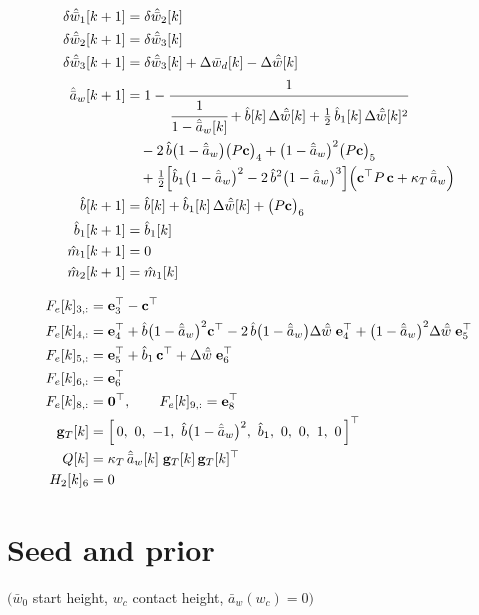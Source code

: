 \documentclass[11pt,a4paper,fontset=none]{ctexart}
\newcommand{\ba}{\bar{a}}
\newcommand{\bw}{\bar{w}}
\newcommand{\dWh}{\Delta\hat{\bw}}
\newcommand{\ah}{\hat{\ba}_w}
\newcommand{\bh}{\hat{b}}
\newcommand{\bhh}{\hat{b}_1}
\begin{document}
\begin{align*}
\delta\hat{\bw}_1[k+1] &= \delta\hat{\bw}_2[k] \\
\delta\hat{\bw}_2[k+1] &= \delta\hat{\bw}_3[k] \\
\delta\hat{\bw}_3[k+1] &= \delta\hat{\bw}_3[k] + \Delta\bw_d[k] - \dWh[k] \\
\ah[k+1] &= 1 - \cfrac{1}{\cfrac{1}{1-\ah[k]} + \bh[k]\,\dWh[k] + \tfrac{1}{2}\,\bhh[k]\,\dWh[k]^{2}} \\
         &\quad - 2\,\bh\bigl(1-\ah\bigr)\bigl(P\mathbf{c}\bigr)_4 + \bigl(1-\ah\bigr)^{2}\bigl(P\mathbf{c}\bigr)_5 \\
         &\quad + \tfrac{1}{2}\Bigl[\bhh\bigl(1-\ah\bigr)^{2} - 2\,\bh^{2}\bigl(1-\ah\bigr)^{3}\Bigr]\Bigl(\mathbf{c}^{\top}P\,\mathbf{c} + \kappa_T\,\ah\Bigr) \\
\bh[k+1]  &= \bh[k] + \bhh[k]\,\dWh[k] + \bigl(P\mathbf{c}\bigr)_6 \\
\bhh[k+1] &= \bhh[k] \\
\hat m_1[k+1] &= 0 \\
\hat m_2[k+1] &= \hat m_1[k]
\end{align*}

\begin{align*}
F_e[k]_{3,:} &= \mathbf{e}_3^{\top} - \mathbf{c}^{\top} \\
F_e[k]_{4,:} &= \mathbf{e}_4^{\top} + \bh\bigl(1-\ah\bigr)^{2}\mathbf{c}^{\top} - 2\,\bh\bigl(1-\ah\bigr)\dWh\;\mathbf{e}_4^{\top} + \bigl(1-\ah\bigr)^{2}\dWh\;\mathbf{e}_5^{\top} \\
F_e[k]_{5,:} &= \mathbf{e}_5^{\top} + \bhh\,\mathbf{c}^{\top} + \dWh\;\mathbf{e}_6^{\top} \\
F_e[k]_{6,:} &= \mathbf{e}_6^{\top} \\
F_e[k]_{8,:} &= \mathbf{0}^{\top} , \qquad F_e[k]_{9,:} = \mathbf{e}_8^{\top} \\
\mathbf{g}_T[k] &= \Bigl[\,0,\ 0,\ -1,\ \bh\bigl(1-\ah\bigr)^{2},\ \bhh,\ 0,\ 0,\ 1,\ 0\,\Bigr]^{\top} \\
Q[k] &= \kappa_T\,\ah[k]\;\mathbf{g}_T[k]\,\mathbf{g}_T[k]^{\top} \\
H_2[k]_{6} &= 0
\end{align*}

\section*{Seed and prior}

$\bigl(\bw_0$ start height, $w_c$ contact height, $\ba_w(w_c) = 0\bigr)$
\end{document}
